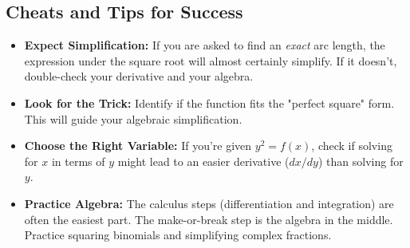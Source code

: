 \documentclass{article}
\begin{document}
\subsection{Cheats and Tips for Success}
\begin{itemize}
    \item \textbf{Expect Simplification:} If you are asked to find an \textit{exact} arc length, the expression under the square root will almost certainly simplify. If it doesn't, double-check your derivative and your algebra.
    \item \textbf{Look for the Trick:} Identify if the function fits the "perfect square" form. This will guide your algebraic simplification.
    \item \textbf{Choose the Right Variable:} If you're given $y^2 = f(x)$, check if solving for $x$ in terms of $y$ might lead to an easier derivative ($dx/dy$) than solving for $y$.
    \item \textbf{Practice Algebra:} The calculus steps (differentiation and integration) are often the easiest part. The make-or-break step is the algebra in the middle. Practice squaring binomials and simplifying complex fractions.
\end{itemize}
\end{document}
